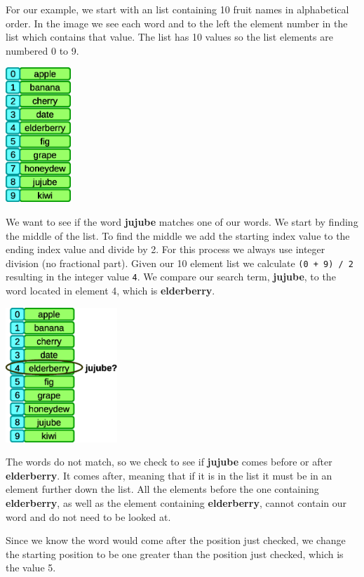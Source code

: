 For our example, we start with an list containing 10 fruit names in alphabetical order. In the image we see each word and to the left the element number in the list which contains that value. The list has 10 values so the list elements are numbered 0 to 9.

\beforefig
\centerline{\includegraphics[height=2in]{figs2/recursion-binsearch-initiallist.eps}}
\afterfig

We want to see if the word \textbf{jujube} matches one of our words. We start by finding the middle of the list. To find the middle we add the starting index value to the ending index value and divide by 2. For this process we always use integer division (no fractional part). Given our 10 element list we calculate \texttt{(0 + 9) / 2} resulting in the integer value \texttt{4}. We compare our search term, \textbf{jujube}, to the word located in element 4, which is \textbf{elderberry}.

\beforefig
\centerline{\includegraphics[height=2in]{figs2/recursion-binsearch-success-1.eps}}
\afterfig

The words do not match, so we check to see if \textbf{jujube} comes before or after \textbf{elderberry}. It comes after, meaning that if it is in the list it must be in an element further down the list. All the elements before the one containing \textbf{elderberry}, as well as the element containing \textbf{elderberry}, cannot contain our word and do not need to be looked at.

Since we know the word would come after the position just checked, we change the starting position to be one greater than the position just checked, which is the value  5.

